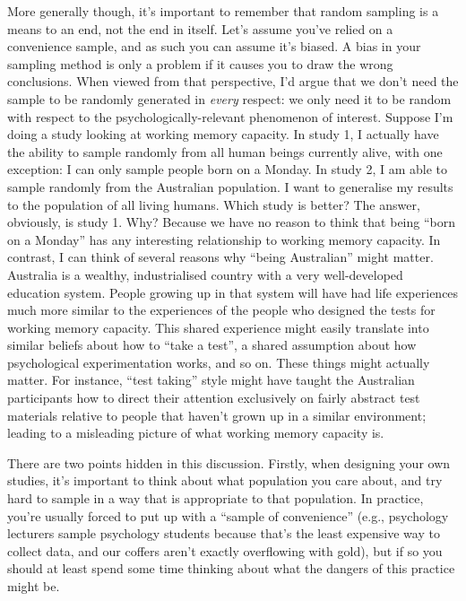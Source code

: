 \documentclass[
]{book}
\begin{document}
More generally though, it's important to remember that random sampling is a means to an end, not the end in itself. Let's assume you've relied on a convenience sample, and as such you can assume it's biased. A bias in your sampling method is only a problem if it causes you to draw the wrong conclusions. When viewed from that perspective, I'd argue that we don't need the sample to be randomly generated in \emph{every} respect: we only need it to be random with respect to the psychologically-relevant phenomenon of interest. Suppose I'm doing a study looking at working memory capacity. In study 1, I actually have the ability to sample randomly from all human beings currently alive, with one exception: I can only sample people born on a Monday. In study 2, I am able to sample randomly from the Australian population. I want to generalise my results to the population of all living humans. Which study is better? The answer, obviously, is study 1. Why? Because we have no reason to think that being ``born on a Monday'' has any interesting relationship to working memory capacity. In contrast, I can think of several reasons why ``being Australian'' might matter. Australia is a wealthy, industrialised country with a very well-developed education system. People growing up in that system will have had life experiences much more similar to the experiences of the people who designed the tests for working memory capacity. This shared experience might easily translate into similar beliefs about how to ``take a test'', a shared assumption about how psychological experimentation works, and so on. These things might actually matter. For instance, ``test taking'' style might have taught the Australian participants how to direct their attention exclusively on fairly abstract test materials relative to people that haven't grown up in a similar environment; leading to a misleading picture of what working memory capacity is.

There are two points hidden in this discussion. Firstly, when designing your own studies, it's important to think about what population you care about, and try hard to sample in a way that is appropriate to that population. In practice, you're usually forced to put up with a ``sample of convenience'' (e.g., psychology lecturers sample psychology students because that's the least expensive way to collect data, and our coffers aren't exactly overflowing with gold), but if so you should at least spend some time thinking about what the dangers of this practice might be.
\end{document}
